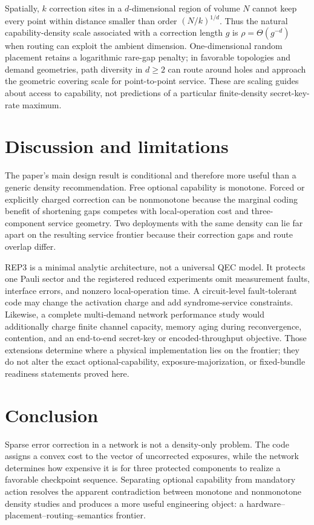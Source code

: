 \documentclass[aps,prx,reprint,superscriptaddress,nofootinbib,longbibliography,floatfix]{revtex4-2}
\begin{document}
Spatially, $k$ correction sites in a $d$-dimensional region of volume $N$ cannot keep every point within distance smaller than order $(N/k)^{1/d}$. Thus the natural capability-density scale associated with a correction length $g$ is $\rho=\Theta(g^{-d})$ when routing can exploit the ambient dimension. One-dimensional random placement retains a logarithmic rare-gap penalty; in favorable topologies and demand geometries, path diversity in $d\ge2$ can route around holes and approach the geometric covering scale for point-to-point service. These are scaling guides about access to capability, not predictions of a particular finite-density secret-key-rate maximum.

\section{Discussion and limitations}
The paper's main design result is conditional and therefore more useful than a generic density recommendation. Free optional capability is monotone. Forced or explicitly charged correction can be nonmonotone because the marginal coding benefit of shortening gaps competes with local-operation cost and three-component service geometry. Two deployments with the same density can lie far apart on the resulting service frontier because their correction gaps and route overlap differ.

REP3 is a minimal analytic architecture, not a universal QEC model. It protects one Pauli sector and the registered reduced experiments omit measurement faults, interface errors, and nonzero local-operation time. A circuit-level fault-tolerant code may change the activation charge and add syndrome-service constraints. Likewise, a complete multi-demand network performance study would additionally charge finite channel capacity, memory aging during reconvergence, contention, and an end-to-end secret-key or encoded-throughput objective. Those extensions determine where a physical implementation lies on the frontier; they do not alter the exact optional-capability, exposure-majorization, or fixed-bundle readiness statements proved here.

\section{Conclusion}
Sparse error correction in a network is not a density-only problem. The code assigns a convex cost to the vector of uncorrected exposures, while the network determines how expensive it is for three protected components to realize a favorable checkpoint sequence. Separating optional capability from mandatory action resolves the apparent contradiction between monotone and nonmonotone density studies and produces a more useful engineering object: a hardware--placement--routing--semantics frontier.
\end{document}
